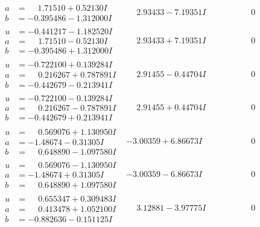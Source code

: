 \documentclass[1p]{elsarticle_modified}
\theoremstyle{definition}
\begin{document}
$$\begin{array}{c|c|c}
\begin{aligned}
a &= \phantom{-}1.71510 + 0.52130 I \\
b &= -0.395486 - 1.312000 I\end{aligned}
 & \phantom{-}2.93433 - 7.19351 I & \phantom{-0.000000 } 0 \\ \hline\begin{aligned}
u &= -0.441217 - 1.182520 I \\
a &= \phantom{-}1.71510 - 0.52130 I \\
b &= -0.395486 + 1.312000 I\end{aligned}
 & \phantom{-}2.93433 + 7.19351 I & \phantom{-0.000000 } 0 \\ \hline\begin{aligned}
u &= -0.722100 + 0.139284 I \\
a &= \phantom{-}0.216267 + 0.787891 I \\
b &= -0.442679 - 0.213941 I\end{aligned}
 & \phantom{-}2.91455 - 0.44704 I & \phantom{-0.000000 } 0 \\ \hline\begin{aligned}
u &= -0.722100 - 0.139284 I \\
a &= \phantom{-}0.216267 - 0.787891 I \\
b &= -0.442679 + 0.213941 I\end{aligned}
 & \phantom{-}2.91455 + 0.44704 I & \phantom{-0.000000 } 0 \\ \hline\begin{aligned}
u &= \phantom{-}0.569076 + 1.130950 I \\
a &= -1.48674 - 0.31305 I \\
b &= \phantom{-}0.648890 - 1.097580 I\end{aligned}
 & -3.00359 + 6.86673 I & \phantom{-0.000000 } 0 \\ \hline\begin{aligned}
u &= \phantom{-}0.569076 - 1.130950 I \\
a &= -1.48674 + 0.31305 I \\
b &= \phantom{-}0.648890 + 1.097580 I\end{aligned}
 & -3.00359 - 6.86673 I & \phantom{-0.000000 } 0 \\ \hline\begin{aligned}
u &= \phantom{-}0.655347 + 0.309483 I \\
a &= \phantom{-}0.413478 + 1.052100 I \\
b &= -0.882636 - 0.151125 I\end{aligned}
 & \phantom{-}3.12881 - 3.97775 I & \phantom{-0.000000 } 0 \\ \hline\begin{aligned}

\end{aligned}
\end{array}$$
\end{document}
